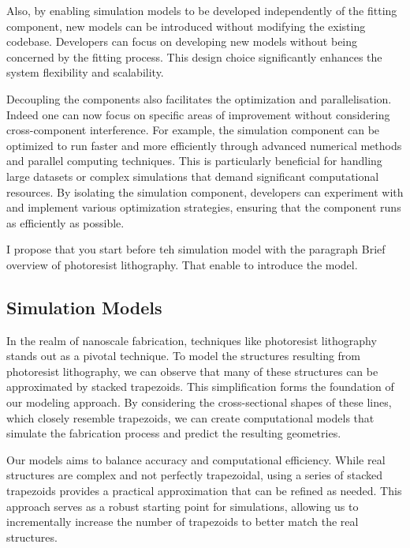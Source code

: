 \medskip

Also, by enabling simulation models to be developed independently of the fitting component, 
new models can be introduced without modifying the existing codebase. Developers can 
focus on developing new models without being concerned by the fitting process. 
This design choice significantly enhances the system flexibility and scalability.

\medskip

Decoupling the components also facilitates the optimization and parallelisation. Indeed one can now focus on specific areas of improvement without
considering cross-component interference. For example, the simulation component can be optimized to
run faster and more efficiently through advanced numerical methods and parallel 
computing techniques. This is particularly beneficial for handling large datasets or complex simulations that demand significant 
computational resources. By isolating the simulation component, developers can experiment with and implement various optimization strategies, 
ensuring that the component runs as efficiently as possible.

\medskip

\color{red}I propose that you start before teh simulation model with the paragraph Brief overview of photoresist lithography.
That enable to introduce the model. \color{black}


\subsection{Simulation Models}

In the realm of nanoscale fabrication, techniques like photoresist lithography stands out as a pivotal technique. To model the structures 
resulting from photoresist lithography, we can observe that many of these structures can be approximated by stacked trapezoids. 
This simplification forms the foundation of our modeling approach. By considering the cross-sectional shapes of these lines, which 
closely resemble trapezoids, we can create computational models that simulate the fabrication process and predict the resulting 
geometries.

\medskip

Our models aims to balance accuracy and computational efficiency. While real structures are complex and not perfectly trapezoidal, 
using a series of stacked trapezoids provides a practical approximation that can be refined as needed. This approach serves as a robust
starting point for simulations, allowing us to incrementally increase the number of trapezoids to better match the real structures.

